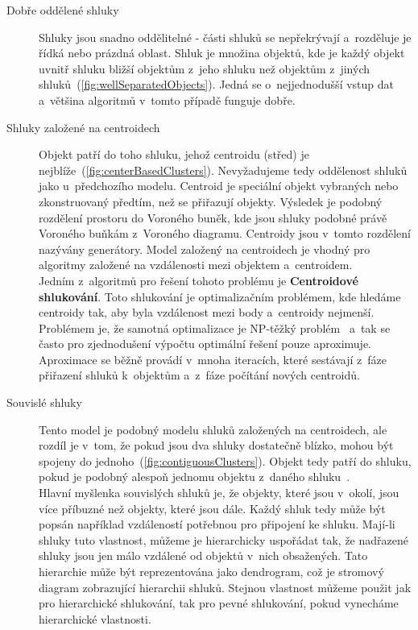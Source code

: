 \begin{description}
\item[Dobře oddělené shluky] Shluky jsou snadno oddělitelné - části shluků se ne\-pře\-krý\-va\-jí a~rozděluje je řídká nebo prázdná oblast. Shluk je množina objektů, kde je každý objekt uvnitř shluku bližší objektům z~jeho shluku než objektům z~jiných shluků~(\autoref{fig:wellSeparatedObjects}). Jedná se o~nejjednodušší vstup dat a~většina algoritmů v~tomto případě funguje dobře.

\item[Shluky založené na centroidech] Objekt patří do toho shluku, jehož centroidu (střed) je nejblíže~(\autoref{fig:centerBasedClusters}). Nevyžadujeme tedy oddělenost shluků jako u~předchozího modelu. Centroid je speciální objekt vybraných nebo zkonstruovaný předtím, než se přiřazují objekty. Výsledek je podobný rozdělení prostoru do Voroného buněk, kde jsou shluky podobné právě Voroného buňkám z~Voroného diagramu. Centroidy jsou v~tomto rozdělení nazývány generátory. Model založený na centroidech je vhodný pro algoritmy založené na vzdálenosti mezi objektem a~centroidem.\\

Jedním z~algoritmů pro řešení tohoto problému je \textbf{Centroidové shlukování}. Toto shlukování je optimalizačním problémem, kde hledáme centroidy tak, aby byla vzdálenost mezi body a~centroidy nejmenší. Problémem je, že samotná optimalizace je NP-těžký problém~\cite{Drineas04} a~tak se často pro zjednodušení výpočtu optimální řešení pouze aproximuje. Aproximace se běžně provádí v~mnoha iteracích, které sestávají z~fáze přiřazení shluků k~objektům a~z~fáze počítání nových centroidů.

\item[Souvislé shluky] Tento model je podobný modelu shluků založených na centroidech, ale rozdíl je v~tom, že pokud jsou dva shluky dostatečně blízko, mohou být spojeny do jednoho~(\autoref{fig:contiguousClusters}). Objekt tedy patří do shluku, pokud je podobný alespoň jednomu objektu z~daného shluku~\cite{Tan05}. \\

Hlavní myšlenka souvislých shluků je, že objekty, které jsou v~okolí, jsou více příbuzné než objekty, které jsou dále. Každý shluk tedy může být popsán například vzdáleností potřebnou pro připojení ke shluku. Mají-li shluky tuto vlastnost, můžeme je hierarchicky uspořádat tak, že nadřazené shluky jsou jen málo vzdálené od objektů v~nich obsažených. Tato hierarchie může být reprezentována jako dendrogram, což je stromový diagram zobrazující hierarchii shluků. Stejnou vlastnost můžeme použit jak pro hierarchické shlukování, tak pro pevné shlukování, pokud vynecháme hierarchické vlastnosti. \\


\end{description}
